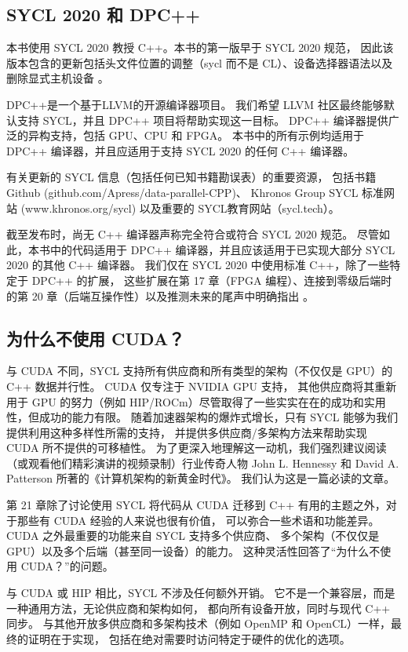 \subsection{SYCL 2020 和 DPC++}
本书使用 SYCL 2020 教授 C++。本书的第一版早于 SYCL 2020 规范，
因此该版本包含的更新包括头文件位置的调整（sycl 而不是 CL）、设备选择器语法以及删除显式主机设备 。

DPC++是一个基于LLVM的开源编译器项目。 我们希望 LLVM 社区最终能够默认支持 SYCL，并且 DPC++ 项目将帮助实现这一目标。 
DPC++ 编译器提供广泛的异构支持，包括 GPU、CPU 和 FPGA。 
本书中的所有示例均适用于 DPC++ 编译器，并且应适用于支持 SYCL 2020 的任何 C++ 编译器。

\begin{remark}
	有关更新的 SYCL 信息（包括任何已知书籍勘误表）的重要资源，
	包括书籍 Github (github.com/Apress/data-parallel-CPP)、
	Khronos Group SYCL 标准网站 (www.khronos.org/sycl) 以及重要的 SYCL教育网站（sycl.tech）。
\end{remark}

截至发布时，尚无 C++ 编译器声称完全符合或符合 SYCL 2020 规范。 
尽管如此，本书中的代码适用于 DPC++ 编译器，并且应该适用于已实现大部分 SYCL 2020 的其他 C++ 编译器。 
我们仅在 SYCL 2020 中使用标准 C++，除了一些特定于 DPC++ 的扩展，
这些扩展在第 17 章（FPGA 编程）、连接到零级后端时的第 20 章（后端互操作性）以及推测未来的尾声中明确指出 。

\subsection{为什么不使用 CUDA？}
与 CUDA 不同，SYCL 支持所有供应商和所有类型的架构（不仅仅是 GPU）的 C++ 数据并行性。 
CUDA 仅专注于 NVIDIA GPU 支持，
其他供应商将其重新用于 GPU 的努力（例如 HIP/ROCm）尽管取得了一些实实在在的成功和实用性，但成功的能力有限。 
随着加速器架构的爆炸式增长，只有 SYCL 能够为我们提供利用这种多样性所需的支持，
并提供多供应商/多架构方法来帮助实现 CUDA 所不提供的可移植性。 
为了更深入地理解这一动机，我们强烈建议阅读（或观看他们精彩演讲的视频录制）行业传奇人物 John L. Hennessy 
和 David A. Patterson 所著的《计算机架构的新黄金时代》。 我们认为这是一篇必读的文章。

第 21 章除了讨论使用 SYCL 将代码从 CUDA 迁移到 C++ 有用的主题之外，对于那些有 CUDA 经验的人来说也很有价值，
可以弥合一些术语和功能差异。 CUDA 之外最重要的功能来自 SYCL 支持多个供应商、
多个架构（不仅仅是 GPU）以及多个后端（甚至同一设备）的能力。 这种灵活性回答了“为什么不使用 CUDA？”的问题。

与 CUDA 或 HIP 相比，SYCL 不涉及任何额外开销。 它不是一个兼容层，而是一种通用方法，无论供应商和架构如何，
都向所有设备开放，同时与现代 C++ 同步。 
与其他开放多供应商和多架构技术（例如 OpenMP 和 OpenCL）一样，最终的证明在于实现，
包括在绝对需要时访问特定于硬件的优化的选项。

